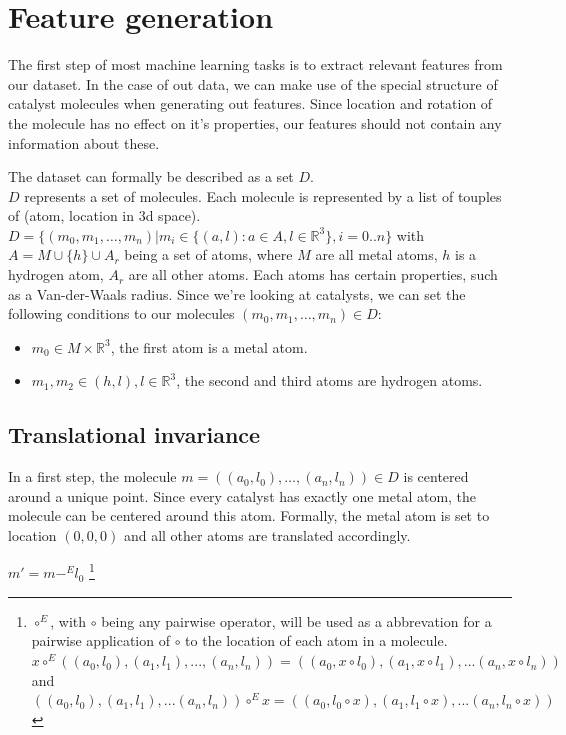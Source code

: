 
\chapter{Feature generation}
\label{ch:Content1}

The first step of most machine learning tasks is to extract relevant features from our dataset.
In the case of out data, we can make use of the special structure of catalyst molecules when generating out features.
Since location and rotation of the molecule has no effect on it's properties, our features should not contain any information about these.

The dataset can formally be described as a set $D$. \\
$D$ represents a set of molecules. Each molecule is represented by a list of touples of (atom, location in 3d space). \\
$D = \{(m_0, m_1, \dots, m_n)| m_i \in \{ (a, l): a \in A, l \in \mathbb{R}^3\}, i = 0..n\}$ with $A = M \cup \{h\} \cup A_r$ being a set of atoms, where $M$ are all metal atoms, $h$ is a hydrogen atom, $A_r$ are all other atoms. 
Each atoms has certain properties, such as a Van-der-Waals radius. 
Since we're looking at catalysts, we can set the following conditions to our molecules $(m_0, m_1, \dots, m_n) \in D$:
\begin{itemize}
  \item $m_0 \in M \times \mathbb{R}^3$, the first atom is a metal atom.
  \item $m_1, m_2 \in (h, l), l \in \mathbb{R}^3$, the second and third atoms are hydrogen atoms.
\end{itemize}


\section{Translational invariance}


In a first step, the molecule $m=((a_0, l_0),\dots,(a_n, l_n)) \in D$ is centered around a unique point.
Since every catalyst has exactly one metal atom, the molecule can be centered around this atom.
Formally, the metal atom is set to location $(0,0,0)$ and all other atoms are translated accordingly.

$m' = m -^E l_0$ \footnote{$\circ^E$, with $\circ$ being any pairwise operator, will be used as a abbrevation for a pairwise application of $\circ$ to the location of each atom in a molecule.
\\
$x \circ^E ((a_0, l_0), (a_1, l_1), ... ,(a_n, l_n)) = ((a_0, x \circ l_0), (a_1, x \circ l_1), ... (a_n, x \circ l_n))$
\\
and
\\
$((a_0, l_0), (a_1, l_1), ... (a_n, l_n)) \circ^E x = ((a_0, l_0 \circ x), (a_1, l_1 \circ x), ... (a_n, l_n \circ x))$
}


